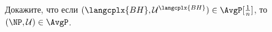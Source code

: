 Докажите, что если $(\langcplx{BH}, \mathcal{U}^{\langcplx{BH}}) \in \AvgP[\frac{1}{n}]$, то
$(\NP, \mathcal{U}) \in \AvgP$.
